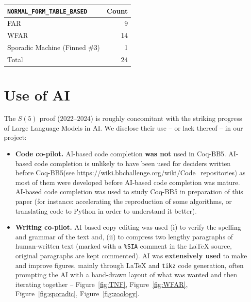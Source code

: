 \documentclass[a4paper,british]{article}
\theoremstyle{definition} %
\numberwithin{equation}{section}
\theoremstyle{definition} %
\newcommand{\CoqBB}{Coq-BB5\xspace}
\begin{document}
\begin{table}[h!]
\begin{minipage}{0.35\linewidth}
\begin{tabular}{|lr|}
            \hline
            \texttt{NORMAL\_FORM\_TABLE\_BASED} & Count \\
            \hline
            FAR                                 & 9     \\
            WFAR                                & 14    \\
            Sporadic Machine (Finned \#3)       & 1     \\
            \hline
            Total                               & 24    \\
            \hline
        \end{tabular}
    \end{minipage}
\end{table}

\vspace{-1em}
\section{Use of AI}

The $S(5)$ proof (2022--2024) is roughly concomitant with the striking progress of Large Language Models in AI. We disclose their use -- or lack thereof -- in our project:

\begin{itemize}
    \item \textbf{Code co-pilot.} AI-based code completion \textbf{was not} used in \CoqBB. AI-based code completion is unlikely to have been used for deciders written before \CoqBB (see \url{https://wiki.bbchallenge.org/wiki/Code_repositories}) as most of them were developed before AI-based code completion was mature. AI-based code completion was used to study \CoqBB in preparation of this paper (for instance: accelerating the reproduction of some algorithms, or translating \Coq code to Python in order to understand it better).
    \item \textbf{Writing co-pilot.} AI based copy editing was used (i) to verify the spelling and grammar of the text and, (ii) to compress two lengthy paragraphs of human-written text (marked with a \texttt{\%SIA} comment in the LaTeX source, original paragraphs are kept commented). AI was \textbf{extensively used} to make and improve figures, mainly through LaTeX and \texttt{tikz} code generation, often prompting the AI with a hand-drawn layout of what was wanted and then iterating together -- \eg Figure~\ref{fig:TNF}, Figure~\ref{fig:WFAR}, Figure~\ref{fig:sporadic}, Figure~\ref{fig:zoology}.

\end{itemize}
\end{document}
